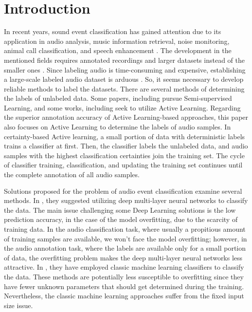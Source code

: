 \documentclass{article}
\begin{document}
\section{Introduction}
In recent years, sound event classification has gained attention due to its application in audio analysis, music information retrieval, noise monitoring, animal call classification, and speech enhancement \citep{Gururani, Wang, Shuyang}. The development in the mentioned fields requires annotated recordings \citep{Shuyang} and larger datasets instead of the smaller ones \citep{Fonseca}. Since labeling audio is time-consuming and expensive, establishing a large-scale labeled audio dataset is arduous \citep{Lee}. So, it seems necessary to develop reliable methods to label the datasets. There are several methods of determining the labels of unlabeled data. Some papers, including \citep{Gururani, Fonseca, Lee, Takagi, Chan, Benito} pursue Semi-supervised Learning, and some works, including \citep{Wang, Shuyang, Dilek, Malte, Qin, Ji} seek to utilize Active Learning. Regarding the superior annotation accuracy of Active Learning-based approaches, this paper also focuses on Active Learning to determine the labels of audio samples. In certainty-based Active learning, a small portion of data with deterministic labels trains a classifier at first. Then, the classifier labels the unlabeled data, and audio samples with the highest classification certainties join the training set. The cycle of classifier training, classification, and updating the training set continues until the complete annotation of all audio samples. 

Solutions proposed for the problem of audio event classification examine several methods. In \citep{Gururani, Fonseca, Lee, Chan, Benito}, they suggested utilizing deep multi-layer neural networks to classify the data. The main issue challenging some Deep Learning solutions is the low prediction accuracy, in the case of the model overfitting, due to the scarcity of training data. In the audio classification task, where usually a propitious amount of training samples are available, we won't face the model overfitting; however, in the audio annotation task, where the labels are available only for a small portion of data, the overfitting problem makes the deep multi-layer neural networks less attractive. In \citep{Wang, Shuyang, Takagi}, they have employed classic machine learning classifiers to classify the data. These methods are potentially less susceptible to overfitting since they have fewer unknown parameters that should get determined during the training. Nevertheless, the classic machine learning approaches suffer from the fixed input size issue. 
\end{document}
